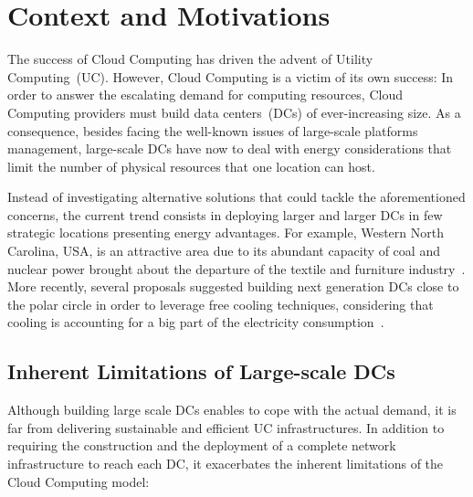\section{Context and Motivations\label{sec:intro}}

The success of Cloud Computing has driven the advent of Utility Computing~(UC). However, Cloud
Computing is a victim of its own success: In order to answer the escalating demand for
computing resources, Cloud Computing providers must build data centers~(DCs) of
ever-increasing size. As a consequence, besides facing the well-known issues of large-scale platforms
management, large-scale DCs have now to deal with energy considerations that limit the number
of physical resources that one location can host.

Instead of investigating alternative solutions that could tackle the aforementioned
concerns, the current trend consists in deploying larger and larger DCs in few strategic
locations presenting energy advantages. For example, Western North Carolina, USA, is an
attractive area due to its abundant capacity of coal and nuclear power brought about the
departure of the textile and furniture industry~\cite{greenpeace:2013}. More recently,
several proposals suggested building next generation DCs close to the polar circle in
order to leverage free cooling techniques, considering that cooling is accounting for a
big part of the electricity consumption~\cite{greenberg:sigcomm09}.

\subsection{Inherent Limitations of Large-scale DCs}

Although building large scale DCs  enables to cope with the actual demand,
it is far from delivering sustainable and efficient UC infrastructures. In addition to
requiring the construction and the deployment of a complete network infrastructure to
reach each DC, it exacerbates the inherent limitations of the Cloud Computing model:


